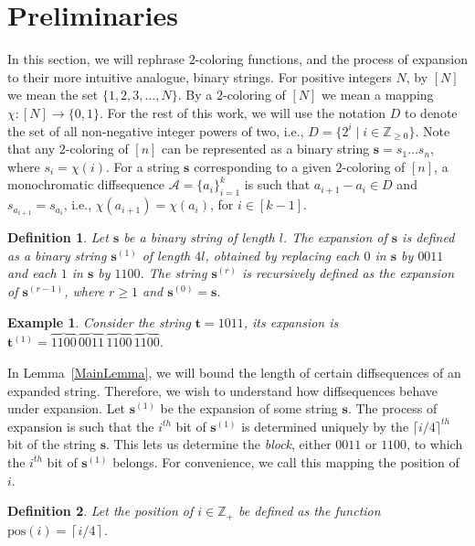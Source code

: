 \documentclass[10pt,a4paper]{amsart}
\newtheorem{ex}{Example}
\newtheorem{definition}{Definition}
\begin{document}
\section{Preliminaries}\label{prev}
In this section, we will rephrase $2$-coloring functions, and the process of expansion to their more intuitive analogue, binary strings. For positive integers \( N \), by \(  [N] \) we mean the set \( \{1, 2, 3, \ldots, N\} \). By a 2-coloring of \([N] \) we mean a mapping \( \chi :[N] \to \{0, 1\} \). For the rest of this work, we will use the notation $D$ to denote the set of all non-negative integer powers of two, i.e., $D=\{2^i\mid i\in\mathbb{Z}_{\ge0}\}$.
Note that any $2$-coloring of $[n]$ can be represented as a binary string $\mathbf{s} = s_1 \ldots s_n$, where $s_i = \chi(i)$. For a string $\mathbf{s}$ corresponding to a given $2$-coloring of $[n]$, a monochromatic diffsequence $\mathcal{A} = \{a_i \}_{i=1}^{k}$ is such that $a_{i+1}-a_i \in D$ and $s_{a_{i+1}} = s_{a_i}$, i.e., $\chi(a_{i+1}) = \chi(a_i)$, for $i \in [k-1]$.
\begin{definition}\label{expand}
    Let $\mathbf{s}$ be a binary string of length $l$. The expansion of $\mathbf{s}$ is defined as a binary string $\mathbf{s}^{(1)}$ of length $4l$, obtained by replacing each $0$ in $\mathbf{s}$ by $0011$ and each $1$ in $\mathbf{s}$ by $1100$. The string $\mathbf{s}^{(r)}$ is recursively defined as the expansion of $\mathbf{s}^{(r-1)}$, where $r \ge 1$ and $\mathbf{s}^{(0)} = \mathbf{s}$.
\end{definition}


\begin{ex}\label{bigex}
    Consider the string $\mathbf{t}=1011$, its expansion is $\mathbf{t}^{(1)} = \overbrace{1100}_{\phantom{.}}\,\overbrace{0011}_{\phantom{.}}\,\overbrace{1100}_{\phantom{.}}\,\overbrace{1100}_{\phantom{.}}$. 
\end{ex}
In Lemma~\ref{MainLemma}, we will bound the length of certain diffsequences of an expanded string. Therefore, we wish to understand how diffsequences behave under expansion. Let $\mathbf{s}^{(1)}$ be the expansion of some string $\mathbf{s}$. The process of expansion is such that the $i^{th}$ bit of $\mathbf{s}^{(1)}$ is determined uniquely by the $\lceil i/4 \rceil^{th}$ bit of the string $\mathbf{s}$. This lets us determine the \textit{block}, either $0011$ or $1100$, to which the $i^{th}$ bit of $\mathbf{s}^{(1)}$ belongs. For convenience, we call this mapping the position of $i$.
\begin{definition}\label{pos}
    Let the position of $i \in \mathbb{Z}_{+}$ be defined as the function $\text{pos}(i)=\left\lceil i/4 \right\rceil$.
\end{definition}
\end{document}
